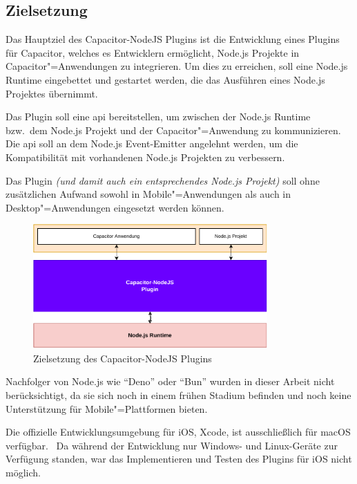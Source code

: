 \subsection{Zielsetzung}

Das Hauptziel des Capacitor-NodeJS Plugins ist die Entwicklung eines Plugins für Capacitor, welches es Entwicklern ermöglicht, Node.js Projekte in Capacitor"=Anwendungen zu integrieren.
Um dies zu erreichen, soll eine Node.js Runtime eingebettet und gestartet werden, die das Ausführen eines Node.js Projektes übernimmt.

Das Plugin soll eine \ac{api} bereitstellen, um zwischen der Node.js Runtime bzw.\ dem Node.js Projekt und der Capacitor"=Anwendung zu kommunizieren.
Die \ac{api} soll an dem Node.js Event-Emitter angelehnt werden, um die Kompatibilität mit vorhandenen Node.js Projekten zu verbessern.

Das Plugin \textit{(und damit auch ein entsprechendes Node.js Projekt)} soll ohne zusätzlichen Aufwand sowohl in Mobile"=Anwendungen als auch in Desktop"=Anwendungen eingesetzt werden können.

\vspace{1em}

\begin{figure}[h]
  \centering
  \includegraphics[width=0.8\textwidth]{assets/02_Capacitor-NodeJS/01_Zielsetzung.drawio.pdf}
  \caption[Capacitor-NodeJS / Zielsetzung]{Zielsetzung des Capacitor-NodeJS Plugins}
\end{figure}

Nachfolger von Node.js wie \enquote{Deno} oder \enquote{Bun} wurden in dieser Arbeit nicht berücksichtigt, da sie sich noch in einem frühen Stadium befinden und noch keine Unterstützung für Mobile"=Plattformen bieten.
\cite{deno, bun}

\begin{note}
  Die offizielle Entwicklungsumgebung für iOS, Xcode, ist ausschließlich für macOS verfügbar.~\cite{xcode:support}
  Da während der Entwicklung nur Windows- und Linux-Geräte zur Verfügung standen, war das Implementieren und Testen des Plugins für iOS nicht möglich.
\end{note}

